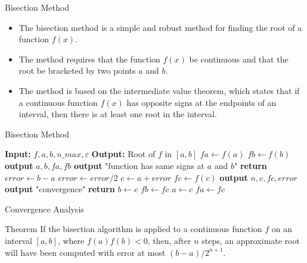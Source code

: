 \documentclass{beamer}
\begin{document}
\begin{frame}{Bisection Method}
  \begin{itemize}
    \item The bisection method is a simple and robust method for finding the root of a function $f(x)$.
    \item The method requires that the function $f(x)$ be continuous and that the root be bracketed by two points $a$ and $b$.
    \item The method is based on the intermediate value theorem, which states that if a continuous function $f(x)$ has opposite signs at the endpoints of an interval, then there is at least one root in the interval.
  \end{itemize}
\end{frame}

\begin{frame}[fragile]{Bisection Method}
  \tiny
    \begin{algorithmic}
      \State \textbf{Input:} $f, a, b, n\_max, \varepsilon$
      \State \textbf{Output:} Root of $f$ in $[a, b]$
      \State $fa \gets f(a)$
      \State $fb \gets f(b)$
        \State \textbf{output} $a, b, fa, fb$
        \State \textbf{output} "function has same signs at $a$ and $b$"
        \State \textbf{return}
      \EndIf
      \State $error \gets b - a$
        \State $error \gets error / 2$
        \State $c \gets a + error$
        \State $fc \gets f(c)$
        \State \textbf{output} $n, c, fc, error$
          \State \textbf{output} "convergence"
          \State \textbf{return}
        \EndIf
          \State $b \gets c$
          \State $fb \gets fc$
        \Else
          \State $a \gets c$
          \State $fa \gets fc$
        \EndIf
      \EndFor
    \EndProcedure
    \end{algorithmic}
\end{frame}
\begin{frame}{Convergence Analysis}
\begin{block}{Theorem}
  If the bisection algorithm is applied to a continuous function $f$ on an interval $[a, b]$, 
  where $f(a) f(b)<0$, then, after $n$ steps, an approximate root will have been computed with 
  error at most $(b-a) / 2^{n+1}$.
  \end{block}
\end{frame}
\end{document}
